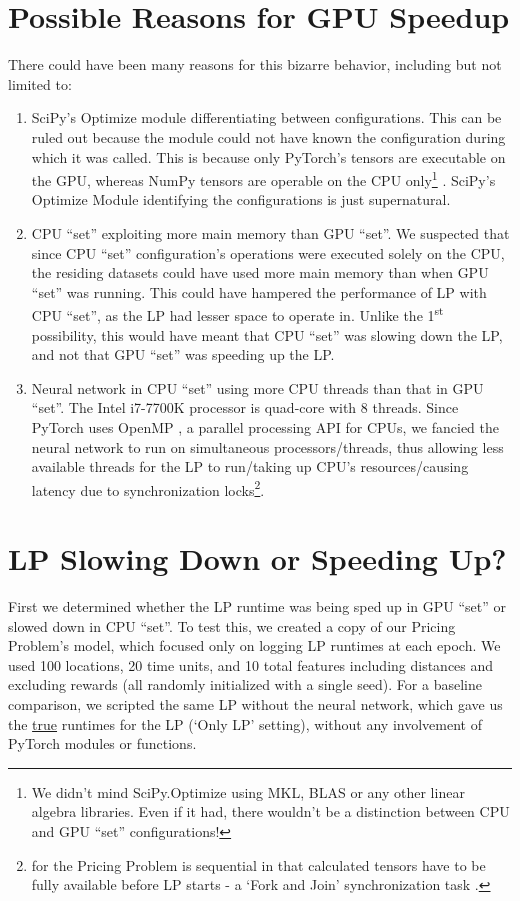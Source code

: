 \section{Possible Reasons for GPU Speedup} \label{app:Possible Reasons for GPU Speedup}
There could have been many reasons for this bizarre behavior, including but not limited to:
\begin{enumerate}
    \item SciPy's Optimize module differentiating between configurations. This can be ruled out because the module could not have known the configuration during which it was called. This is because only PyTorch's tensors are executable on the GPU, whereas NumPy tensors are operable on the CPU only\footnote{We didn't mind SciPy.Optimize using MKL, BLAS or any other linear algebra libraries. Even if it had, there wouldn't be a distinction between CPU and GPU ``set'' configurations!} \cite{PTDocs,NPDocs,SCPOptimizeDocs}. SciPy's Optimize Module identifying the configurations is just supernatural.
    \item CPU ``set'' exploiting more main memory than GPU ``set''. We suspected that since CPU ``set'' configuration's operations were executed solely on the CPU, the residing datasets could have used more main memory than when GPU ``set'' was running. This could have hampered the performance of LP with CPU ``set'', as the LP had lesser space to operate in. Unlike the 1\textsuperscript{st} possibility, this would have meant that CPU ``set'' was slowing down the LP, and not that GPU ``set'' was speeding up the LP.
    \item Neural network in CPU ``set'' using more CPU threads than that in GPU ``set''. The Intel i7-7700K processor is quad-core with 8 threads. Since PyTorch uses OpenMP \cite{PTDocs,OpenMP}, a parallel processing API for CPUs, we fancied the neural network to run on simultaneous processors/threads, thus allowing less available threads for the LP to run/taking up CPU's resources/causing latency due to synchronization locks\footnote{ for the Pricing Problem is sequential in that calculated tensors have to be fully available before LP starts - a `Fork and Join' synchronization task \cite[Section~2.2]{IssuesMP}.}.
\end{enumerate}

\section{LP Slowing Down or Speeding Up?} \label{app:LP Slowing Down or Speeding Up?}
First we determined whether the LP runtime was being sped up in GPU ``set'' or slowed down in CPU ``set''. To test this, we created a copy of our Pricing Problem's model, which focused only on logging LP runtimes at each epoch. We used 100 locations, 20 time units, and 10 total features including distances and excluding rewards (all randomly initialized with a single seed). For a baseline comparison, we scripted the same LP without the neural network, which gave us the \underline{true} runtimes for the LP (`Only LP' setting), without any involvement of PyTorch modules or functions. 


